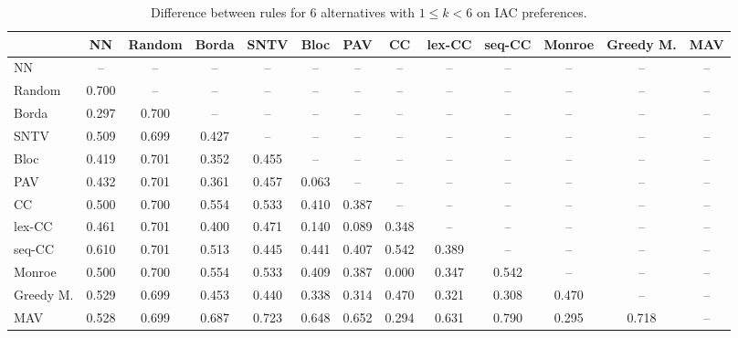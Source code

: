 
\begin{table*}[h!]
\centering
\begin{tabular}{lcccccccccccc}
\toprule
 & NN & Random & Borda & SNTV & Bloc & PAV & CC & lex-CC & seq-CC & Monroe & Greedy M. & MAV \\
\midrule
NN & -- & -- & -- & -- & -- & -- & -- & -- & -- & -- & -- & -- \\
Random & 0.700 & -- & -- & -- & -- & -- & -- & -- & -- & -- & -- & -- \\
Borda & 0.297 & 0.700 & -- & -- & -- & -- & -- & -- & -- & -- & -- & -- \\
SNTV & 0.509 & 0.699 & 0.427 & -- & -- & -- & -- & -- & -- & -- & -- & -- \\
Bloc & 0.419 & 0.701 & 0.352 & 0.455 & -- & -- & -- & -- & -- & -- & -- & -- \\
PAV & 0.432 & 0.701 & 0.361 & 0.457 & 0.063 & -- & -- & -- & -- & -- & -- & -- \\
CC & 0.500 & 0.700 & 0.554 & 0.533 & 0.410 & 0.387 & -- & -- & -- & -- & -- & -- \\
lex-CC & 0.461 & 0.701 & 0.400 & 0.471 & 0.140 & 0.089 & 0.348 & -- & -- & -- & -- & -- \\
seq-CC & 0.610 & 0.701 & 0.513 & 0.445 & 0.441 & 0.407 & 0.542 & 0.389 & -- & -- & -- & -- \\
Monroe & 0.500 & 0.700 & 0.554 & 0.533 & 0.409 & 0.387 & 0.000 & 0.347 & 0.542 & -- & -- & -- \\
Greedy M. & 0.529 & 0.699 & 0.453 & 0.440 & 0.338 & 0.314 & 0.470 & 0.321 & 0.308 & 0.470 & -- & -- \\
MAV & 0.528 & 0.699 & 0.687 & 0.723 & 0.648 & 0.652 & 0.294 & 0.631 & 0.790 & 0.295 & 0.718 & -- \\
\bottomrule
\end{tabular}

\caption{Difference between rules for 6 alternatives with $1 \leq k < 6$ on IAC preferences.}
\end{table*}
